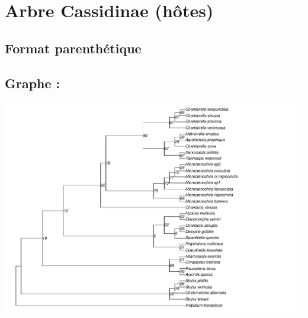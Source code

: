 \documentclass[a4paper, 11pt]{article}
\begin{document}
\section{Arbre Cassidinae (hôtes)}
\subsection{Format parenthétique} 


\subsection{Graphe :}
\includegraphics[width = 1\textwidth]{plot_Cassidinae_28S_D2_PhyML_GTR.pdf}
\end{document}
